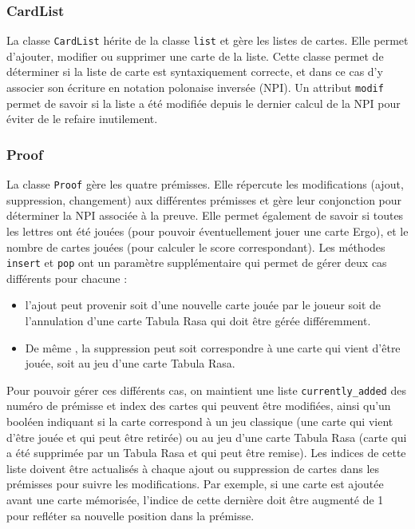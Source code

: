 \documentclass[12pt, algo]{cours}
\begin{document}
\subsubsection{CardList}

La classe \texttt{CardList} hérite de la classe \texttt{list} et gère les listes de cartes. Elle permet d'ajouter, modifier ou supprimer une carte de la liste. Cette classe permet de déterminer si la liste de carte est syntaxiquement correcte, et dans ce cas d'y associer son écriture en notation polonaise inversée (NPI). Un attribut \texttt{modif} permet de savoir si la liste a été modifiée depuis le dernier calcul de la NPI pour éviter de le refaire inutilement.

\subsubsection{Proof}

La classe \texttt{Proof} gère les quatre prémisses. Elle répercute les modifications (ajout, suppression, changement) aux différentes prémisses et gère leur conjonction pour déterminer la NPI associée à la preuve. Elle permet également de savoir si toutes les lettres ont été jouées (pour pouvoir éventuellement jouer une carte Ergo), et le nombre de cartes jouées (pour calculer le score correspondant). Les méthodes \texttt{insert} et \texttt{pop} ont un paramètre supplémentaire qui permet de gérer deux cas différents pour chacune :
\begin{itemize}
\item l'ajout peut provenir soit d'une nouvelle carte jouée par le joueur soit de l'annulation d'une carte Tabula Rasa qui doit être gérée différemment.
\item De même , la suppression peut soit correspondre à une carte qui vient d'être jouée, soit au jeu d'une carte Tabula Rasa.
\end{itemize}

Pour pouvoir gérer ces différents cas, on maintient une liste \texttt{currently\_added} des numéro de prémisse et index des cartes qui peuvent être modifiées, ainsi qu'un booléen indiquant si la carte correspond à un jeu \og classique \fg (une carte qui vient d'être jouée et qui peut être retirée) ou au jeu d'une carte Tabula Rasa (carte qui a été supprimée par un Tabula Rasa et qui peut être remise). Les indices de cette liste doivent être actualisés à chaque ajout ou suppression de cartes dans les prémisses pour suivre les modifications. Par exemple, si une carte est ajoutée avant une carte mémorisée, l'indice de cette dernière doit être augmenté de 1 pour refléter sa nouvelle position dans la prémisse.
\end{document}
